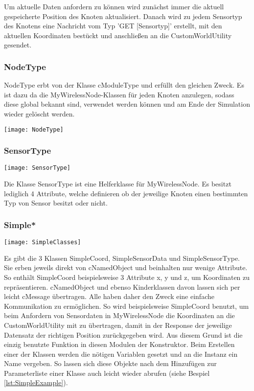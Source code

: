 Um aktuelle Daten anfordern zu können wird zunächst immer die aktuell gespeicherte Position des Knoten aktualisiert. Danach wird zu jedem Sensortyp des Knotens eine Nachricht vom Typ 'GET [Sensortyp]' erstellt, mit den aktuellen Koordinaten bestückt und anschließen an die CustomWorldUtility gesendet.

\subsubsection{NodeType}

NodeType erbt von der Klasse cModuleType und erfüllt den gleichen Zweck. Es ist dazu da die MyWirelessNode-Klassen für jeden Knoten anzulegen, sodass diese global bekannt sind, verwendet werden können und am Ende der Simulation wieder gelöscht werden.

\begin{center}
\texttt{[image: NodeType]}
\end{center}

\subsubsection{SensorType}

\begin{center}
\texttt{[image: SensorType]}
\end{center}

Die Klasse SensorType ist eine Helferklasse für MyWirelessNode. Es besitzt lediglich 4 Attribute, welche definieren ob der jeweilige Knoten einen bestimmten Typ von Sensor besitzt oder nicht.

\subsubsection{Simple*}

\begin{center}
\texttt{[image: SimpleClasses]}
\end{center}

Es gibt die 3 Klassen SimpleCoord, SimpleSensorData und SimpleSensorType.  Sie erben jeweils direkt von cNamedObject und beinhalten nur wenige Attribute. So enthält SimpleCoord beispielsweise 3 Attribute x, y und z, um Koordinaten zu repräsentieren.\newline
cNamedObject und ebenso Kinderklassen davon lassen sich per leicht cMessage übertragen. Alle haben daher den Zweck eine einfache Kommunikation zu ermöglichen. So wird beispielsweise SimpleCoord benutzt, um beim Anfordern von Sensordaten in MyWirelessNode die Koordinaten an die CustomWorldUtility mit zu übertragen, damit in der Response der jeweilige Datensatz der richtigen Position zurückgegeben wird.\newline
Aus diesem Grund ist die einzig benutzte Funktion in diesen Modulen der Konstruktor. Beim Erstellen einer der Klassen werden die nötigen Variablen gesetzt und an die Instanz ein Name vergeben. So lassen sich diese Objekte nach dem Hinzufügen zur Parameterliste einer Klasse auch leicht wieder abrufen (siehe Bespiel \ref{lst:SimpleExample}).


